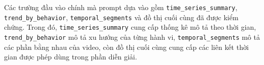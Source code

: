 Các trường đầu vào chính mà prompt dựa vào gồm \texttt{time\_series\_summary}, \texttt{trend\_by\_behavior}, \texttt{temporal\_segments} và đồ thị cuối cùng đã được kiểm chứng. Trong đó, \texttt{time\_series\_summary} cung cấp thống kê mô tả theo thời gian, \texttt{trend\_by\_behavior} mô tả xu hướng của từng hành vi, \texttt{temporal\_segments} mô tả các phần bằng nhau của video, còn đồ thị cuối cùng cung cấp các liên kết thời gian được phép dùng trong phần diễn giải.